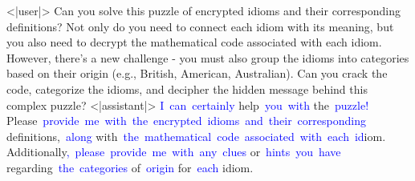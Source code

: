 \documentclass{article}
\begin{document}
\begin{tcolorbox}[colframe=black,colback=white]
<|user|>
Can you solve this puzzle of encrypted idioms and their corresponding definitions? Not only do you need to connect each idiom with its meaning, but you also need to decrypt the mathematical code associated with each idiom. However, there's a new challenge - you must also group the idioms into categories based on their origin (e.g., British, American, Australian). Can you crack the code, categorize the idioms, and decipher the hidden message behind this complex puzzle?
<|assistant|>
\textcolor{blue}{I}\textcolor{blue}{~can}\textcolor{blue}{~certainly} help\textcolor{blue}{~you}\textcolor{blue}{~with} the\textcolor{blue}{~puzzle}\textcolor{blue}{!} Please\textcolor{blue}{~provide}\textcolor{blue}{~me}\textcolor{blue}{~with}\textcolor{blue}{~the}\textcolor{blue}{~encrypted}\textcolor{blue}{~idi}\textcolor{blue}{oms}\textcolor{blue}{~and}\textcolor{blue}{~their}\textcolor{blue}{~corresponding} definitions,\textcolor{blue}{~along} with\textcolor{blue}{~the}\textcolor{blue}{~mathematical}\textcolor{blue}{~code}\textcolor{blue}{~associated}\textcolor{blue}{~with}\textcolor{blue}{~each}\textcolor{blue}{~id}iom. Additionally\textcolor{blue}{,}\textcolor{blue}{~please}\textcolor{blue}{~provide}\textcolor{blue}{~me}\textcolor{blue}{~with}\textcolor{blue}{~any}\textcolor{blue}{~clues} or\textcolor{blue}{~hints}\textcolor{blue}{~you}\textcolor{blue}{~have} regarding\textcolor{blue}{~the}\textcolor{blue}{~categories} of\textcolor{blue}{~origin} for\textcolor{blue}{~each} idiom.\textcolor{blue}{}
\end{tcolorbox}
\end{document}
